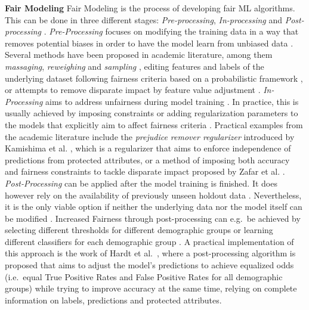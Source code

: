 \textbf{Fair Modeling} \newline
Fair Modeling is the process of developing fair ML algorithms. This can be done in three different stages: \textit{Pre-processing}, \textit{In-processing} and \textit{Post-processing} \parencite{Pessach2020}. \newline
\textit{Pre-Processing} focuses on modifying the training data in a way that removes potential biases in order to have the model learn from unbiased data \parencite{Bellamy2019}.
Several methods have been proposed in academic literature, among them \textit{massaging}, \textit{reweighing} and \textit{sampling} \parencite{Kamiran2012}, editing features and labels of the underlying dataset following fairness criteria based on a probabilistic framework \parencite{Calmon2017}, or attempts to remove disparate impact by feature value adjustment \parencite{Feldman2015}. \newline
\textit{In-Processing} aims to address unfairness during model training \parencite{Alessandro2017}. In practice, this is usually achieved by imposing constraints or adding regularization parameters to the models that explicitly aim to affect fairness criteria \parencite{Pessach2020}.
Practical examples from the academic literature include the \textit{prejudice remover regularizer} introduced by Kamishima et al. \parencite{Kamishima2012}, which is a regularizer that aims to enforce independence of predictions from protected attributes, or a method of imposing both accuracy and fairness constraints to tackle disparate impact proposed by Zafar et al. \parencite{Zafar2017}. \newline
\textit{Post-Processing} can be applied after the model training is finished. It does however rely on the availability of previously unseen holdout data \parencite{Alessandro2017}. Nevertheless, it is the only viable option if neither the underlying data nor the model itself can be modified \parencite{Bellamy2019}.
Increased Fairness through post-processing can e.g.\ be achieved by selecting different thresholds for different demographic groups or learning different classifiers for each demographic group \parencite{Pessach2020}.
A practical implementation of this approach is the work of Hardt et al.\ \parencite{Hardt2016}, where a post-processing algorithm is proposed that aims to adjust the model's predictions to achieve equalized odds (i.e.\ equal True Positive Rates and False Positive Rates for all demographic groups) while trying to improve accuracy at the same time, relying on complete information on labels, predictions and protected attributes. 

